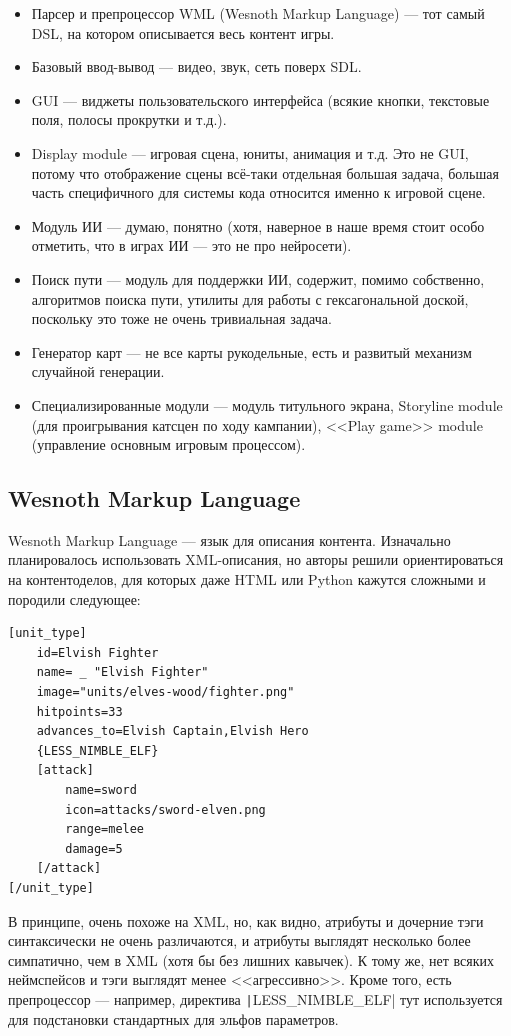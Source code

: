 \documentclass[a5paper]{article}
\begin{document}
\begin{itemize}
    \item Парсер и препроцессор WML (Wesnoth Markup Language) --- тот самый DSL, на котором описывается весь контент игры.
    \item Базовый ввод-вывод --- видео, звук, сеть поверх SDL.
    \item GUI --- виджеты пользовательского интерфейса (всякие кнопки, текстовые поля, полосы прокрутки и т.д.).
    \item Display module --- игровая сцена, юниты, анимация и т.д. Это не GUI, потому что отображение сцены всё-таки отдельная большая задача, большая часть специфичного для системы кода относится именно к игровой сцене.
    \item Модуль ИИ --- думаю, понятно (хотя, наверное в наше время стоит особо отметить, что в играх ИИ --- это не про нейросети).
    \item Поиск пути --- модуль для поддержки ИИ, содержит, помимо собственно, алгоритмов поиска пути, утилиты для работы с гексагональной доской, поскольку это тоже не очень тривиальная задача.
    \item Генератор карт --- не все карты рукодельные, есть и развитый механизм случайной генерации.
    \item Специализированные модули --- модуль титульного экрана, Storyline module (для проигрывания катсцен по ходу кампании), <<Play game>> module (управление основным игровым процессом).
\end{itemize}

\subsection{Wesnoth Markup Language}

Wesnoth Markup Language --- язык для описания контента. Изначально планировалось использовать XML-описания, но авторы решили ориентироваться на контентоделов, для которых даже HTML или Python кажутся сложными и породили следующее:

\begin{verbatim}
[unit_type]
    id=Elvish Fighter
    name= _ "Elvish Fighter"
    image="units/elves-wood/fighter.png"
    hitpoints=33
    advances_to=Elvish Captain,Elvish Hero
    {LESS_NIMBLE_ELF}
    [attack]
        name=sword
        icon=attacks/sword-elven.png
        range=melee
        damage=5
    [/attack]
[/unit_type]
\end{verbatim}

В принципе, очень похоже на XML, но, как видно, атрибуты и дочерние тэги синтаксически не очень различаются, и атрибуты выглядят несколько более симпатично, чем в XML (хотя бы без лишних кавычек). К тому же, нет всяких неймспейсов и тэги выглядят менее <<агрессивно>>. Кроме того, есть препроцессор --- например, директива \texttt|{LESS_NIMBLE_ELF}| тут используется для подстановки стандартных для эльфов параметров.
\end{document}
